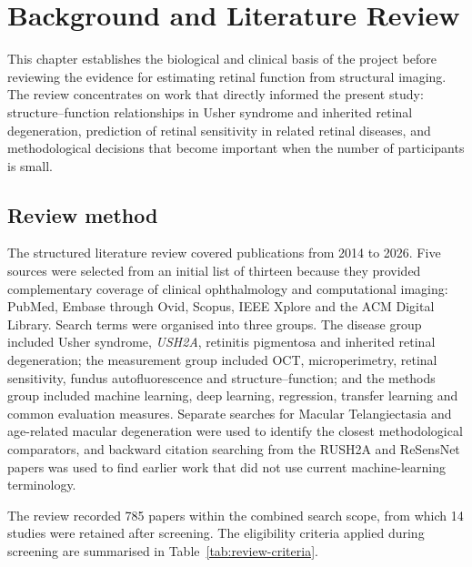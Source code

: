 \chapter{Background and Literature Review}
\label{chap:background}

This chapter establishes the biological and clinical basis of the project before reviewing the evidence for estimating retinal function from structural imaging. The review concentrates on work that directly informed the present study: structure--function relationships in Usher syndrome and inherited retinal degeneration, prediction of retinal sensitivity in related retinal diseases, and methodological decisions that become important when the number of participants is small.

\section{Review method}

The structured literature review covered publications from 2014 to 2026. Five sources were selected from an initial list of thirteen because they provided complementary coverage of clinical ophthalmology and computational imaging: PubMed, Embase through Ovid, Scopus, IEEE Xplore and the ACM Digital Library. Search terms were organised into three groups. The disease group included Usher syndrome, \textit{USH2A}, retinitis pigmentosa and inherited retinal degeneration; the measurement group included OCT, microperimetry, retinal sensitivity, fundus autofluorescence and structure--function; and the methods group included machine learning, deep learning, regression, transfer learning and common evaluation measures. Separate searches for Macular Telangiectasia and age-related macular degeneration were used to identify the closest methodological comparators, and backward citation searching from the RUSH2A and ReSensNet papers was used to find earlier work that did not use current machine-learning terminology.

The review recorded 785 papers within the combined search scope, from which 14 studies were retained after screening. The eligibility criteria applied during screening are summarised in Table~\ref{tab:review-criteria}.

